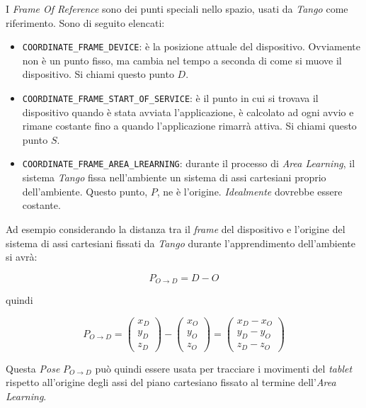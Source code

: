 \begin{pose}
	I \emph{Frame Of Reference} sono dei punti speciali nello spazio, usati da \emph{Tango} come riferimento. Sono di seguito elencati:
	\begin{itemize}
		\item \texttt{COORDINATE\_FRAME\_DEVICE}: è la posizione attuale del dispositivo. Ovviamente non è un punto fisso, ma cambia nel tempo a seconda di come si muove il dispositivo. Si chiami questo punto $D$.
		\item \texttt{COORDINATE\_FRAME\_START\_OF\_SERVICE}: è il punto in cui si trovava il dispositivo quando è stata avviata l'applicazione, è calcolato ad ogni avvio e rimane costante fino a quando l'applicazione rimarrà attiva. Si chiami questo punto $S$.
		\item \texttt{COORDINATE\_FRAME\_AREA\_LREARNING}: durante il processo di \emph{Area Learning}, il sistema \emph{Tango} fissa nell'ambiente un sistema di assi cartesiani proprio dell'ambiente. Questo punto, $P$, ne è l'origine. \textit{Idealmente} dovrebbe essere costante.
	\end{itemize}
\end{pose}
Ad esempio considerando la distanza tra il \emph{frame} del dispositivo e l'origine del sistema di assi cartesiani fissati da \emph{Tango} durante l'apprendimento dell'ambiente si avrà:

$$P_{O \rightarrow D} = D - O$$

quindi

$$
	P_{O \rightarrow D} =
	\begin{pmatrix} x_{D} \\ y_{D} \\ z_{D} \end{pmatrix} -
	\begin{pmatrix} x_{O} \\ y_{O} \\ z_{O} \end{pmatrix} =
	\begin{pmatrix}
		x_{D} - x_{O} \\
	 	y_{D} - y_{O} \\
	 	z_{D} - z_{O}
	\end{pmatrix}
$$

Questa \emph{Pose} $P_{O \rightarrow D}$ può quindi essere usata per tracciare i movimenti del \emph{tablet} rispetto all'origine degli assi del piano cartesiano fissato al termine dell'\emph{Area Learning}.\\


